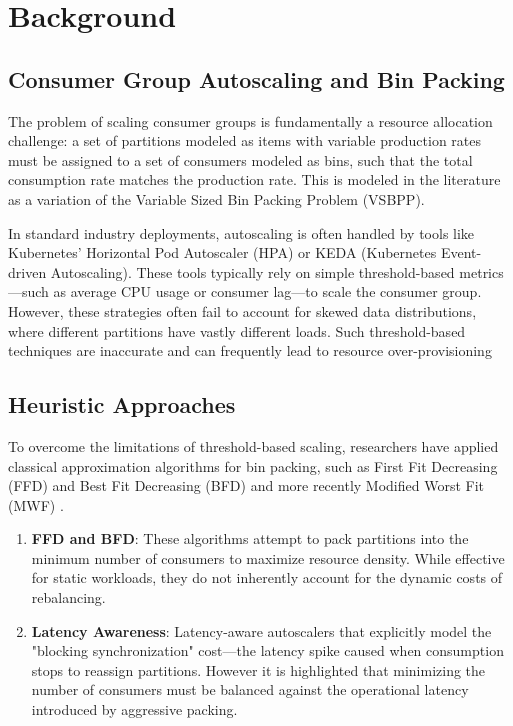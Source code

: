 ﻿\documentclass[conference]{IEEEtran}
\begin{document}
\section{Background}
\subsection{Consumer Group Autoscaling and Bin Packing}

The problem of scaling consumer groups is fundamentally a resource allocation challenge: a set of partitions modeled as items with variable production rates must be assigned to a set of consumers modeled as bins, such that the total consumption rate matches the production rate. This is modeled in the literature as a variation of the Variable Sized Bin Packing Problem (VSBPP). \cite{Landau2025}

In standard industry deployments, autoscaling is often handled by tools like Kubernetes' Horizontal Pod Autoscaler (HPA) or KEDA (Kubernetes Event-driven Autoscaling). These tools typically rely on simple threshold-based metrics—such as average CPU usage or consumer lag—to scale the consumer group. However, these strategies often fail to account for skewed data distributions, where different partitions have vastly different loads. Such threshold-based techniques are inaccurate and can frequently lead to resource over-provisioning \cite{Wang2022}


\subsection{Heuristic Approaches}
To overcome the limitations of threshold-based scaling, researchers have applied classical approximation algorithms for bin packing, such as First Fit Decreasing (FFD) and Best Fit Decreasing (BFD) and more recently Modified Worst Fit (MWF) \cite{Landau2025}.

\begin{enumerate}
    \item \textbf{FFD and BFD}: These algorithms attempt to pack partitions into the minimum number of consumers to maximize resource density. While effective for static workloads, they do not inherently account for the dynamic costs of rebalancing.
    \item \textbf{Latency Awareness}: Latency-aware autoscalers that explicitly model the "blocking synchronization" cost—the latency spike caused when consumption stops to reassign partitions. However it is highlighted that minimizing the number of consumers must be balanced against the operational latency introduced by aggressive packing. \cite{Ezzeddine2025}
\end{enumerate}
\end{document}
